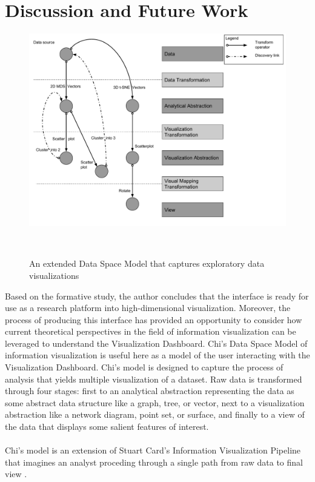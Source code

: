 \documentclass{sigchi}
\begin{document}
\section{Discussion and Future Work}%
%
\begin{figure}
  \centering
  \includegraphics[width=1.5\columnwidth]{figures/extended}
  \caption{An extended Data Space Model that captures exploratory data visualizations}~\label{fig:figure2}
\end{figure}
%
Based on the formative study, the author concludes that the interface is ready for use as a research platform into high-dimensional visualization.%
%
Moreover, the process of producing this interface has provided an opportunity to consider how current theoretical perspectives in the field of information visualization can be leveraged to understand the Visualization Dashboard. %
%
Chi's Data Space Model of information visualization is useful here as a model of the user interacting with the Visualization Dashboard.%
%
Chi's model is designed to capture the process of analysis that yields multiple visualization of a dataset. %
%
Raw data is transformed through four stages: first to an analytical abstraction representing the data as some abstract data structure like a graph, tree, or vector, next to a visualization abstraction like a network diagram, point set, or surface, and finally to a view of the data that displays some salient features of interest. %
%
\\\\
%
Chi's model is an extension of Stuart Card's Information Visualization Pipeline that imagines an analyst proceding through a single path from raw data to final view \cite{chi1999framework}. %
\end{document}
